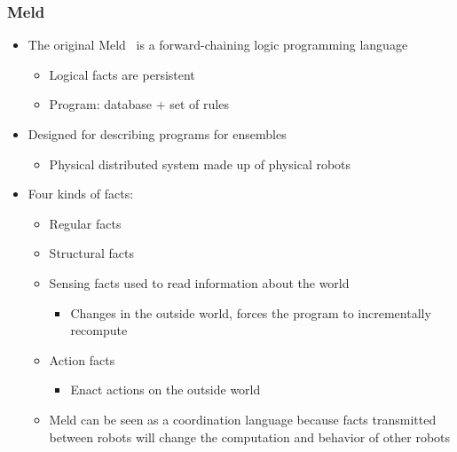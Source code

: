 \documentclass{beamer}
\begin{document}
\frame
{
   \frametitle{Meld}
   \begin{itemize}
      \item The original Meld~\cite{ashley-rollman-iclp09} is a forward-chaining logic programming language
      \begin{itemize}
         \item Logical facts are persistent
         \item Program: database + set of rules
      \end{itemize}
      
      \item Designed for describing programs for ensembles
      \begin{itemize}
         \item Physical distributed system made up of physical robots
      \end{itemize}
      
      \item Four kinds of facts:
      \begin{itemize}
         \item Regular facts
         \item Structural facts
         \item Sensing facts used to read information about the world
         \begin{itemize}
            \item Changes in the outside world, forces the program to incrementally recompute
         \end{itemize}
      
         \item Action facts
         \begin{itemize}
            \item Enact actions on the outside world
         \end{itemize}
      
         \item Meld can be seen as a coordination language because facts transmitted between robots will change the computation and behavior of other robots
      \end{itemize}
   \end{itemize}
}
\end{document}
